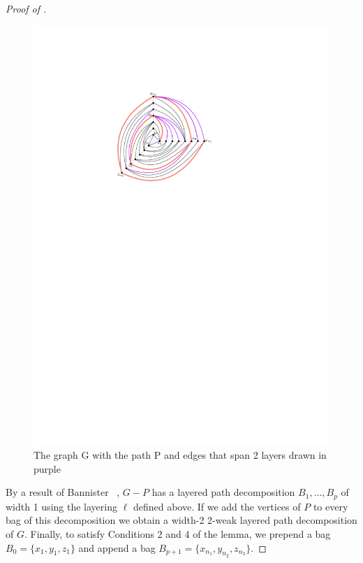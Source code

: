 \documentclass{patmorin}
\begin{document}
\begin{proof}[Proof of ]
  \begin{figure}
   \begin{center}
      \includegraphics{figs/prism_graph-3}
   \end{center}
   \caption{The graph G with the path P and edges that span 2 layers drawn in purple}
  \end{figure}

  By a result of Bannister \etal\ \cite[Proof of
  Theorem~5]{bannister2018track}, $G-P$ has a layered
  path decomposition $B_1,\ldots,B_p$ of width 1 using the layering
  $\ell$ defined above.  If we add the vertices of $P$ to every bag
  of this decomposition we obtain a width-2 2-weak layered path
  decomposition of $G$.  Finally, to satisfy Conditions 2 and 4 of
  the lemma, we prepend a bag $B_0=\{x_1,y_1,z_1\}$ and append a bag
  $B_{p+1}=\{x_{n_1},y_{n_2},z_{n_3}\}$.
\end{proof}
\end{document}
